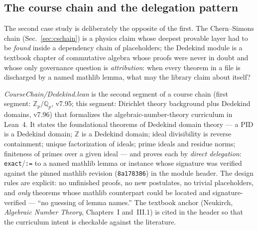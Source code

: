 
\subsection{The course chain and the delegation pattern}
\label{sec:dedekind-chain}
The second case study is deliberately the opposite of the first.
The Chern--Simons chain (Sec.~\ref{sec:cschain}) is a physics claim
whose deepest provable layer had to be \emph{found} inside a
dependency chain of placeholders; the Dedekind module is a textbook
chapter of commutative algebra whose proofs were never in doubt and
whose only governance question is \emph{attribution}: when every
theorem in a file is discharged by a named mathlib lemma, what may
the library claim about itself?

\emph{CourseChain/Dedekind.lean} is the second segment of a course
chain (first segment: $\mathbb{Z}_p/\mathbb{Q}_p$, v7.95; this
segment: Dirichlet theory background plus Dedekind domains, v7.96)
that formalizes the algebraic-number-theory curriculum in Lean~4.
It states the foundational theorems of Dedekind domain theory ---
a PID is a Dedekind domain; $\mathbb{Z}$ is a Dedekind domain;
ideal divisibility is reverse containment; unique factorization of
ideals; prime ideals and residue norms; finiteness of primes over
a given ideal --- and proves each by \emph{direct delegation}:
\texttt{exact}/\texttt{:=} to a named mathlib lemma or instance
whose signature was verified against the pinned mathlib revision
(\texttt{8a178386}) in the module header. The design rules are
explicit: no unfinished proofs, no new postulates, no trivial
placeholders, and \emph{only} theorems whose mathlib counterpart
could be located and signature-verified --- ``no guessing of lemma
names.'' The textbook anchor (Neukirch, \emph{Algebraic Number
Theory}, Chapters~I and~III.1) is cited in the header so that the
curriculum intent is checkable against the literature.

